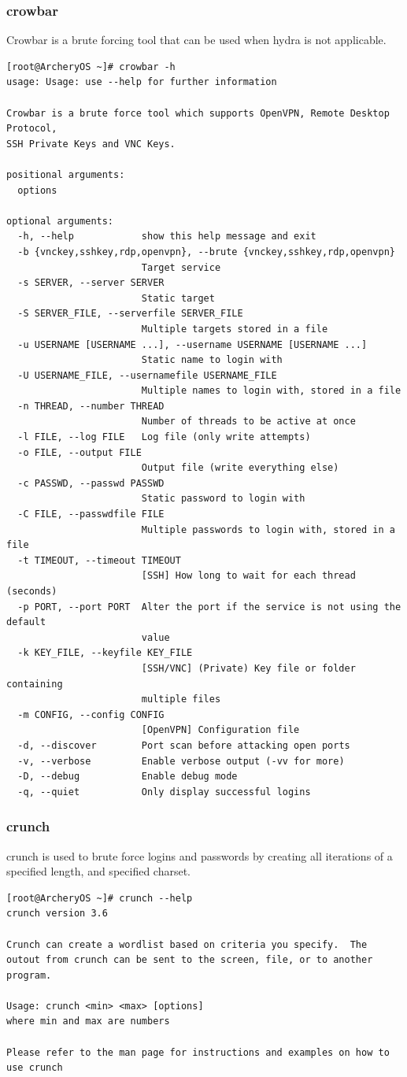 \documentclass{article}
\begin{document}
\subsubsection{crowbar}
Crowbar is a brute forcing tool that can be used when hydra is not applicable.
\begin{lstlisting}
[root@ArcheryOS ~]# crowbar -h
usage: Usage: use --help for further information

Crowbar is a brute force tool which supports OpenVPN, Remote Desktop Protocol,
SSH Private Keys and VNC Keys.

positional arguments:
  options

optional arguments:
  -h, --help            show this help message and exit
  -b {vnckey,sshkey,rdp,openvpn}, --brute {vnckey,sshkey,rdp,openvpn}
                        Target service
  -s SERVER, --server SERVER
                        Static target
  -S SERVER_FILE, --serverfile SERVER_FILE
                        Multiple targets stored in a file
  -u USERNAME [USERNAME ...], --username USERNAME [USERNAME ...]
                        Static name to login with
  -U USERNAME_FILE, --usernamefile USERNAME_FILE
                        Multiple names to login with, stored in a file
  -n THREAD, --number THREAD
                        Number of threads to be active at once
  -l FILE, --log FILE   Log file (only write attempts)
  -o FILE, --output FILE
                        Output file (write everything else)
  -c PASSWD, --passwd PASSWD
                        Static password to login with
  -C FILE, --passwdfile FILE
                        Multiple passwords to login with, stored in a file
  -t TIMEOUT, --timeout TIMEOUT
                        [SSH] How long to wait for each thread (seconds)
  -p PORT, --port PORT  Alter the port if the service is not using the default
                        value
  -k KEY_FILE, --keyfile KEY_FILE
                        [SSH/VNC] (Private) Key file or folder containing
                        multiple files
  -m CONFIG, --config CONFIG
                        [OpenVPN] Configuration file
  -d, --discover        Port scan before attacking open ports
  -v, --verbose         Enable verbose output (-vv for more)
  -D, --debug           Enable debug mode
  -q, --quiet           Only display successful logins
\end{lstlisting}

\subsubsection{crunch}
crunch is used to brute force logins and passwords by creating all iterations of a specified length, and specified charset.
\begin{lstlisting}
[root@ArcheryOS ~]# crunch --help
crunch version 3.6

Crunch can create a wordlist based on criteria you specify.  The outout from crunch can be sent to the screen, file, or to another program.

Usage: crunch <min> <max> [options]
where min and max are numbers

Please refer to the man page for instructions and examples on how to use crunch
\end{lstlisting}
\end{document}
